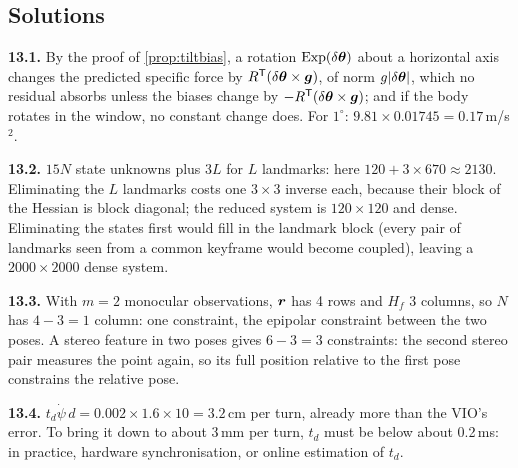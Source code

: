 \subsection*{Solutions}

\textbf{13.1.} By the proof of \cref{prop:tiltbias}, a rotation
$\operatorname{Exp}(\delta\bm{\theta})$ about a horizontal axis changes the predicted specific
force by $R^{\mathsf{T}}(\delta\bm{\theta}\times\bm{g})$, of norm $g|\delta\bm{\theta}|$, which
no residual absorbs unless the biases change by $-R^{\mathsf{T}}(\delta\bm{\theta}\times
\bm{g})$; and if the body rotates in the window, no constant change
does. For $1^\circ$: $9.81\times0.01745=0.17$\,m/s$^2$.

\textbf{13.2.} $15N$ state unknowns plus $3L$ for $L$ landmarks: here
$120+3\times670\approx2130$. Eliminating the $L$ landmarks costs one
$3\times3$ inverse each, because their block of the Hessian is block
diagonal; the reduced system is $120\times120$ and dense. Eliminating
the states first would fill in the landmark block (every pair of
landmarks seen from a common keyframe would become coupled), leaving a
$2000\times2000$ dense system.

\textbf{13.3.} With $m=2$ monocular observations, $\bm{r}$ has 4 rows
and $H_f$ 3 columns, so $N$ has $4-3=1$ column: one constraint, the
epipolar constraint between the two poses. A stereo feature in two poses
gives $6-3=3$ constraints: the second stereo pair measures the point
again, so its full position relative to the first pose constrains the
relative pose.

\textbf{13.4.} $t_d\dot\psi\,d=0.002\times1.6\times10=3.2$\,cm per turn,
already more than the VIO's error. To bring it down to about 3\,mm per
turn, $t_d$ must be below about 0.2\,ms: in practice, hardware
synchronisation, or online estimation of $t_d$.
